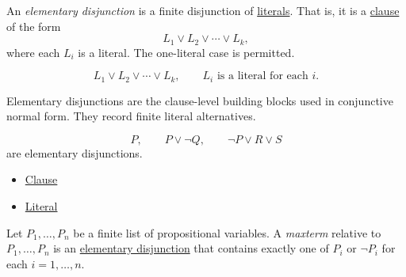 \begin{tcolorbox}[colback=propbox, colframe=propborder, arc=2pt, left=6pt, right=6pt, top=4pt, bottom=4pt, title={\small\textbf{Definition (Elementary Disjunction)}}]
\begin{definition}
\label{def:elementary-disjunction-propositional-logic}
An \emph{elementary disjunction} is a finite disjunction of
\hyperref[def:literal-propositional-logic]{literals}. That is, it is a
\hyperref[def:clause-propositional-logic]{clause} of the form
\[
L_1\lor L_2\lor\cdots\lor L_k,
\]
where each \(L_i\) is a literal. The one-literal case is permitted.
\end{definition}
\end{tcolorbox}

\begin{remark*}
\[
L_1\lor L_2\lor\cdots\lor L_k,
\qquad
L_i\text{ is a literal for each }i.
\]
\end{remark*}

\begin{remark*}[Interpretation]
Elementary disjunctions are the clause-level building blocks used in
conjunctive normal form. They record finite literal alternatives.
\end{remark*}

\begin{example*}[Examples]
\[
P,\qquad P\lor\neg Q,\qquad \neg P\lor R\lor S
\]
are elementary disjunctions.
\end{example*}

\begin{dependencies}
\begin{itemize}
  \item \hyperref[def:clause-propositional-logic]{Clause}
  \item \hyperref[def:literal-propositional-logic]{Literal}
\end{itemize}
\end{dependencies}

\begin{tcolorbox}[colback=propbox, colframe=propborder, arc=2pt, left=6pt, right=6pt, top=4pt, bottom=4pt, title={\small\textbf{Definition (Maxterm)}}]
\begin{definition}[Maxterm]
\label{def:maxterm-propositional-logic}
Let \(P_1,\ldots,P_n\) be a finite list of propositional variables. A
\emph{maxterm} relative to \(P_1,\ldots,P_n\) is an
\hyperref[def:elementary-disjunction-propositional-logic]{elementary disjunction}
that contains exactly one of \(P_i\) or \(\neg P_i\) for each
\(i=1,\ldots,n\).
\end{definition}
\end{tcolorbox}

